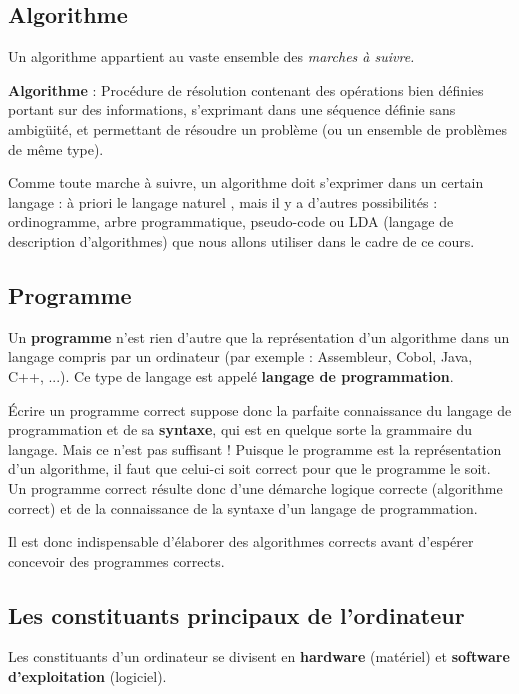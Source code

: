 	\subsection{Algorithme}

		Un algorithme appartient au vaste ensemble des \textit{marches à
		suivre.}

		\textbf{Algorithme} : Procédure de résolution contenant des opérations
		bien définies portant sur des informations, s’exprimant dans une
		séquence définie sans ambigüité, et permettant de résoudre un problème
		(ou un ensemble de problèmes de même type).
	
		Comme toute marche à suivre, un algorithme doit s’exprimer dans un
		certain langage : à priori le langage naturel , mais il y a d’autres
		possibilités : ordinogramme, arbre programmatique, pseudo-code ou LDA
		(langage de description d’algorithmes) que nous allons utiliser dans le
		cadre de ce cours.

	\subsection{Programme}

		Un \textbf{programme} n’est rien d’autre que la représentation d’un
		algorithme dans un langage compris par un ordinateur (par exemple :
		Assembleur, Cobol, Java, 
		C++, ...). Ce type de langage est appelé \textbf{langage de
		programmation}.
		
		Écrire un programme correct suppose donc la parfaite connaissance du
		langage de programmation et de sa \textbf{syntaxe}, qui est en quelque
		sorte la grammaire du langage. Mais ce n’est pas suffisant ! Puisque le
		programme est la représentation d’un algorithme, il faut que celui-ci
		soit correct pour que le programme le soit. Un programme correct
		résulte donc d’une démarche logique correcte (algorithme correct) et de
		la connaissance de la syntaxe d’un langage de programmation.
		
		Il est donc indispensable d’élaborer des algorithmes corrects avant
		d’espérer concevoir des programmes corrects.

	\subsection{Les constituants principaux de l’ordinateur}

		Les constituants d’un ordinateur se divisent en \textbf{hardware}
		(matériel) et \textbf{software d’exploitation} (logiciel).
		
